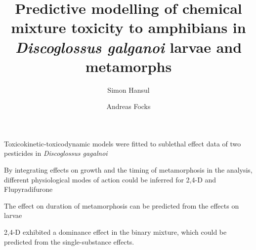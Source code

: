 \documentclass[preprint,12pt]{elsarticle}
\begin{document}
\begin{frontmatter}


\title{
    Predictive modelling of chemical mixture toxicity to amphibians in \textit{Discoglossus galganoi}
    larvae and metamorphs
    }
\author{Simon Hansul}%
\author{Andreas Focks}

\title{} %


\author{} %


\begin{abstract}


\end{abstract}

\begin{graphicalabstract}
\end{graphicalabstract}

\begin{highlights}
\item Toxicokinetic-toxicodynamic models were fitted to sublethal effect data of two pesticides in \textit{Discoglossus gagalnoi}
\item By integrating effects on growth and the timing of metamorphosis in the analysis, different physiological modes of action could be inferred for 2,4-D and Flupyradifurone
\item The effect on duration of metamorphosis can be predicted from the effects on larvae
\item 2,4-D exhibited a dominance effect in the binary mixture, which could be predicted from the single-substance effects.
\end{highlights}


\end{frontmatter}
\end{document}
